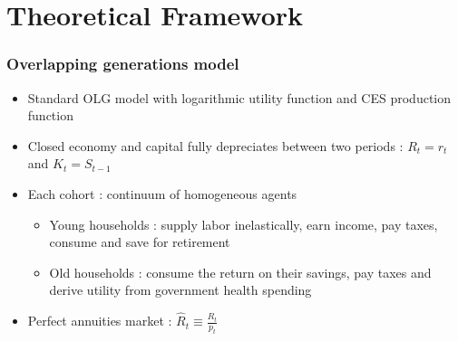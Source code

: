 \documentclass{beamer}
\begin{document}
	\section{Theoretical Framework}
		\begin{frame}[label = olgmodel]\frametitle{Overlapping generations model}
			\begin{itemize}
				\item Standard OLG model with logarithmic utility function and CES production function \hyperlink{preferences<1>}{}
				\item Closed economy and capital fully depreciates between two periods : $R_t = r_t$ and $K_t = S_{t-1}$
				\item Each cohort : continuum of homogeneous agents
				\begin{itemize}
					\item Young households : supply labor inelastically, earn income, pay taxes, consume and save for retirement
					\item Old households : consume the return on their savings, pay taxes and derive utility from government health spending
				\end{itemize}
				\item Perfect annuities market : $\hat{R}_t \equiv \frac{R_t}{p_t}$
			\end{itemize}
		\end{frame}
\end{document}
